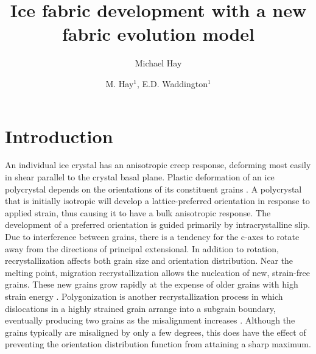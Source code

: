 \documentclass{igs}
\begin{document}
\title{Ice fabric development with a new fabric evolution model}

\author{Michael Hay}

\author[Hay and Waddington]{M. Hay$^1$, E.D. Waddington$^1$}





\maketitle 

\section{Introduction}
An individual ice crystal has an anisotropic creep response, deforming most easily in shear parallel to the crystal basal plane. Plastic deformation of an ice polycrystal depends on the orientations of its constituent grains \citep{azuma94}. A polycrystal that is initially isotropic will develop a lattice-preferred orientation in response to applied strain, thus causing it to have a bulk anisotropic response. The development of a preferred orientation is guided primarily by intracrystalline slip. Due to interference between grains, there is a tendency for the c-axes to rotate away from the directions of principal extensional. In addition to rotation, recrystallization affects both grain size and orientation distribution. Near the melting point, migration recrystallization allows the nucleation of new, strain-free grains. These new grains grow rapidly at the expense of older grains with high strain energy \citep{duval1995}. Polygonization is another recrystallization process in which dislocations in a highly strained grain arrange into a subgrain boundary, eventually producing two grains as the misalignment increases \citep{alley97}. Although the grains typically are misaligned by only a few degrees, this does have the effect of preventing the orientation distribution function from attaining a sharp maximum.
\end{document}
